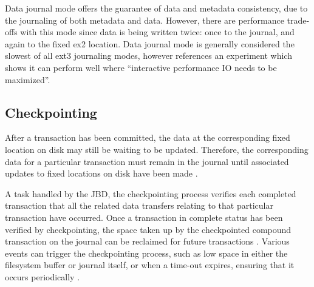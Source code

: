 Data journal mode offers the guarantee of data and metadata consistency, due to the journaling of both metadata and data. However, there are performance trade-offs with this mode since data is being written twice: once to the journal, and again to the fixed ex2 location. Data journal mode is generally considered the slowest of all ext3 journaling modes, however \citet[p. 3]{Robbins2001b} references an experiment which shows it can perform well where ``interactive performance IO needs to be maximized''.

\subsection{Checkpointing}

After a transaction has been committed, the data at the corresponding fixed location on disk may still be waiting to be updated. Therefore, the corresponding data for a particular transaction must remain in the journal until associated updates to fixed locations on disk have been made \citep{Tweedie1998}.

A task handled by the JBD, the checkpointing process verifies each completed transaction that all the related data transfers relating to that particular transaction have occurred. Once a transaction in complete status has been verified by checkpointing, the space taken up by the checkpointed compound transaction on the journal can be reclaimed for future transactions \citep{Tweedie2000, Tweedie1998, Prabhakaran2005a, Devlisden2011, Bovet2006}. Various events can trigger the checkpointing process, such as low space in either the filesystem buffer or journal itself, or when a time-out expires, ensuring that it occurs periodically \citep{Prabhakaran2005a}.



